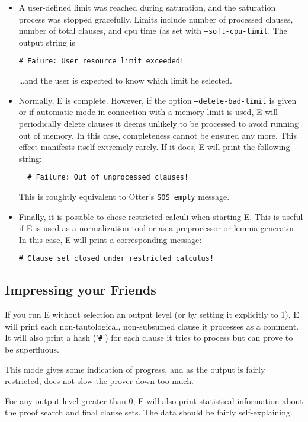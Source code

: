 \documentclass{article}
\begin{document}
\begin{itemize}
\begin{verbatim}
\end{verbatim}
\item A user-defined limit was reached during saturation, and the
  saturation process was stopped gracefully. Limits include number of
  processed clauses, number of total clauses, and cpu time (as set
  with \texttt{--soft-cpu-limit}. The output string is
\begin{verbatim}
# Faiure: User resource limit exceeded!
\end{verbatim}
  \ldots and the user is expected to know which limit he selected.
\item Normally, E is complete. However, if the option
  \texttt{--delete-bad-limit} is given or if automatic mode in
  connection with a memory limit is used, E will periodically delete
  clauses it deems unlikely to be processed to avoid running out of
  memory. In this case, completeness cannot be ensured any more. This
  effect manifests itself extremely rarely. If it does, E will print
  the following string:
\begin{verbatim}
  # Failure: Out of unprocessed clauses!
\end{verbatim}
  This is roughtly equivalent to Otter's \texttt{SOS empty} message.
\item Finally, it is possible to chose restricted calculi when
  starting E. This is useful if E is used as a normalization tool or
  as a preprocessor or lemma generator. In this case, E will print a
  corresponding message:
\begin{verbatim}
# Clause set closed under restricted calculus!
\end{verbatim}
\end{itemize}


\subsection{Impressing your Friends}
\label{sec:output:normal}

If you run E without selection an output level (or by setting it
explicitly to 1), E will print each non-tautological, non-subsumed
clause it processes as a comment. It will also print a hash
('\verb+#+') for each clause it tries to process but can prove to be
superfluous.

This mode gives some indication of progress, and as the output is
fairly restricted, does not slow the prover down too much.

For any output level greater than 0, E will also print statistical
information about the proof search and final clause sets. The data
should be fairly self-explaining.
\end{document}
